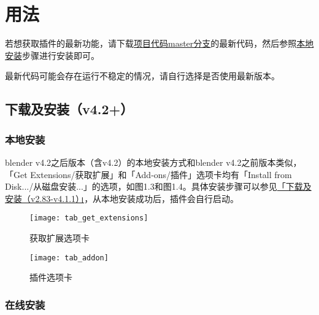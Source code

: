 \documentclass{../../public_resources/doc}
\begin{document}

\section{用法}
若想获取插件的最新功能，请下载\href{https://github.com/Mister-Kin/ToggleLanguage/archive/refs/heads/master.zip}{项目代码master分支}的最新代码，然后参照\hyperlink{local_install}{本地安装}步骤进行安装即可。

最新代码可能会存在运行不稳定的情况，请自行选择是否使用最新版本。

\subsection{下载及安装（v4.2+）}
\subsubsection{本地安装}
\hypertarget{local_install}{}
blender v4.2之后版本（含v4.2）的本地安装方式和blender v4.2之前版本类似，「Get Extensions/获取扩展」和「Add‐ons/插件」选项卡均有「Install from Disk.../从磁盘安装...」的选项，如图1.3和图1.4。具体安装步骤可以参见\hyperlink{install_v283_v411}{「下载及安装（v2.83-v4.1.1）」}，从本地安装成功后，插件会自行启动。

\begin{figure}[h!]
    \begin{minipage}[t]{0.48\linewidth}
        \texttt{[image: tab\_get\_extensions]}
        \caption{获取扩展选项卡}
    \end{minipage}
    \quad
    \begin{minipage}[t]{0.48\linewidth}
        \texttt{[image: tab\_addon]}
        \caption{插件选项卡}
    \end{minipage}
\end{figure}

\subsubsection{在线安装}

\end{document}
